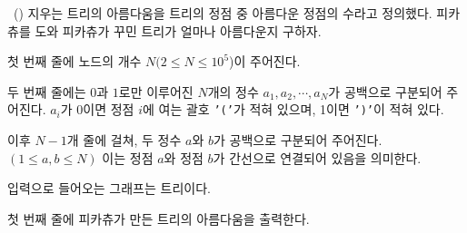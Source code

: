 \begin{problem}{\kcpcprobpretty\ (\kcpcprobprettyshort)}
    지우는 트리의 아름다움을 트리의 정점 중 아름다운 정점의 수라고 정의했다. 피카츄를 도와 피카츄가 꾸민 트리가 얼마나 아름다운지 구하자.
    
    \InputFile
    첫 번째 줄에 노드의 개수 $N(2 \leq N \leq 10^5$)이 주어진다.
    
    두 번째 줄에는 $0$과 $1$로만 이루어진 $N$개의 정수 $a_1, a_2, \cdots, a_N$가 공백으로 구분되어 주어진다. $a_i$가 0이면 정점 $i$에 여는 괄호 \texttt{'('}가 적혀 있으며, 1이면 \texttt{')'}이 적혀 있다.
    
    이후 $N-1$개 줄에 걸쳐, 두 정수 $a$와 $b$가 공백으로 구분되어 주어진다. $ (1 \leq a, b \leq N) $ 이는 정점 $a$와 정점 $b$가 간선으로 연결되어 있음을 의미한다.
    
    입력으로 들어오는 그래프는 트리이다.
    
    \OutputFile
    첫 번째 줄에 피카츄가 만든 트리의 아름다움을 출력한다.
    
    \Examples
    \begin{example}
    \end{example}
    

\end{problem}
